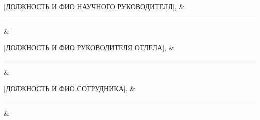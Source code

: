 [ДОЛЖНОСТЬ И ФИО НАУЧНОГО РУКОВОДИТЕЛЯ], & \rule{1\linewidth}{0.1pt} & \\
\vspace{1cm}

[ДОЛЖНОСТЬ И ФИО РУКОВОДИТЕЛЯ ОТДЕЛА], & \rule{1\linewidth}{0.1pt} & \\
\vspace{1cm}

[ДОЛЖНОСТЬ И ФИО СОТРУДНИКА], & \rule{1\linewidth}{0.1pt} & \\

\vspace{0.5cm}
